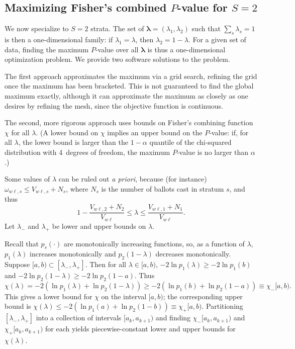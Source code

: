 \documentclass[runningheads]{llncs}
\newcommand{\beq}{\begin{equation}}
\newcommand{\eeq}{\end{equation}}
\begin{document}
\subsection{Maximizing Fisher's combined $P$-value for $S=2$}
We now specialize to $S=2$ strata.
The set of $\mathbf{\lambda} = (\lambda_1, \lambda_2)$ such that $\sum_s \lambda_s = 1$ is then a one-dimensional family: if $\lambda_1 = \lambda$, then $\lambda_2 = 1-\lambda$.
For a given set of data, finding the maximum $P$-value over all $\mathbf{\lambda}$
is thus a one-dimensional optimization problem.
We provide two software solutions to the problem.

The first approach approximates the maximum via a grid search, refining the
grid once the maximum has been bracketed.
This is not guaranteed to find the global maximum exactly, although it can approximate 
the maximum as closely as one desires by refining the mesh, since the objective function is continuous.

The second, more rigorous approach uses bounds on Fisher's combining function $\chi$ for all $\lambda$. 
(A lower bound on $\chi$ implies an upper bound on the $P$-value: if, for all $\lambda$, the lower bound is 
larger than the $1-\alpha$ quantile of the chi-squared distribution with 4~degrees of freedom, the maximum $P$-value is no larger than $\alpha$.)

Some values of $\lambda$ can be ruled out \emph{a priori}, because (for instance) $\omega_{w\ell,s} \le V_{w\ell,s}+N_s$, where $N_s$ is the number of ballots cast in stratum $s$, and thus
\beq
   1 - \frac{V_{w\ell,2}+N_2}{V_{w\ell}} \le \lambda \le \frac{V_{w\ell,1}+N_1}{V_{w\ell}}.
\eeq
Let $\lambda_-$ and $\lambda_+$ be lower and upper bounds on $\lambda$.

Recall that $p_s(\cdot)$ are monotonically increasing functions, so, as a function of $\lambda$, $p_1(\lambda)$ increases monotonically and $p_2(1-\lambda)$ decreases monotonically.
Suppose $[a, b) \subset [\lambda_-, \lambda_+]$.
Then for all $\lambda \in [a, b)$, $-2\ln p_1(\lambda) \ge -2\ln p_1(b)$ and
$-2\ln p_2(1-\lambda) \ge -2\ln p_2(1-a)$.
Thus
\beq\label{eq:lowerbound}
   \chi(\lambda) = -2(\ln p_1(\lambda)+ \ln p_2(1-\lambda))
          \ge -2(\ln p_1(b) + \ln p_2(1-a)) \equiv \chi_-[a,b).
\eeq
This gives a lower bound for $\chi$ on the interval $[a, b)$; the corresponding 
upper bound is $\chi(\lambda) \le -2(\ln p_1(a) + \ln p_2(1-b)) \equiv \chi_+[a,b)$.
Partitioning $[\lambda_-, \lambda_+]$ into a collection of intervals $[a_k, a_{k+1})$
and finding $\chi_-[a_k, a_{k+1})$ and $\chi_+[a_k, a_{k+1})$ for each
yields piecewise-constant lower and upper bounds for $\chi(\lambda)$.
\end{document}
